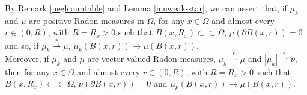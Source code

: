 \begin{remark} By Remark \ref{neglcountable} and Lemma \ref{muweak-star}, we can assert that, if $\mu_{k}$ and $\mu$ are positive Radon measures in $\Omega$, for any $x \in \Omega$ and almost every $r \in (0, R)$, with $R = R_{x} > 0$ such that $B(x, R_{x}) \subset \subset \Omega$, $\mu(\partial B(x,r)) = 0$ and so, if $\mu_{k} \stackrel {*} {\rightharpoonup} \mu$, $\mu_{k}(B(x,r)) \to \mu(B(x,r))$. 
\\
Moreover, if $\mu_{k}$ and $\mu$ are vector valued Radon measures, $\mu_{k} \stackrel {*}{\rightharpoonup} \mu$ and $|\mu_{k}| \stackrel {*} {\rightharpoonup} \nu$, then for any $x \in \Omega$ and almost every $r \in (0, R)$, with $R = R_{x} > 0$ such that $B(x, R_{x}) \subset \subset \Omega$, $\nu(\partial B(x,r)) = 0$ and $\mu_{k}(B(x,r)) \to \mu(B(x,r))$.
\end{remark}










